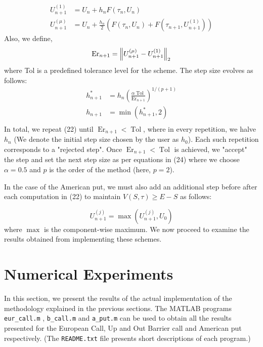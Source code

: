 \documentclass[a4paper,12pt]{article}
\begin{document}
\begin{equation}
    \begin{split}
        U_{n+1}^{(1)} &= U_n + h_n F(\tau_n, U_n)\\
        U_{n+1}^{(\mu)} &= U_n + \frac{h_n}{2}\left( F(\tau_n, U_n) + F(\tau_{n+1}, U_{n+1}^{(1)}) \right)
    \end{split}
\end{equation}
Also, we define,
\begin{equation}
    \operatorname{Er}_{n+1} = {\left \lVert U_{n+1}^{(\mu)} - U_{n+1}^{(1)} \right \rVert}_2
\end{equation}
where Tol is a predefined tolerance level for the scheme. The step size evolves as follows:
\begin{equation}
    \begin{split}
        h_{n+1}^* &= h_n\left( \frac{\alpha \operatorname{Tol}}{\operatorname{Er}_{n+1}} \right)^{1/(p+1)}\\
        h_{n+1} &= \min(h_{n+1}^*, 2)\\
    \end{split}
\end{equation}
In total, we repeat (22) until $\operatorname{Er}_{n+1} < \operatorname{Tol}$, where in every repetition, we halve $h_n$ (We denote the initial step size chosen by the user as $h_0$). Each such repetition corresponds to a "rejected step". Once $\operatorname{Er}_{n+1} < \operatorname{Tol}$ is achieved, we "accept" the step and set the next step size as per equations in (24) where we choose $\alpha = 0.5$ and $p$ is the order of the method (here, $p = 2$).

In the case of the American put, we must also add an additional step before after each computation in (22) to maintain $V(S, \tau) \geq E - S$ as follows:

\begin{equation}
    U_{n+1}^{(j)} = \max(U_{n+1}^{(j)}, U_0)
\end{equation}
where $\max$ is the component-wise maximum. We now proceed to examine the results obtained from implementing these schemes.

\section{Numerical Experiments}

In this section, we present the results of the actual implementation of the methodology explained in the previous sections. The MATLAB programs \texttt{eur\_call.m} , \texttt{b\_call.m} and \texttt{a\_put.m} can be used to obtain all the results presented for the European Call, Up and Out Barrier call and American put respectively. (The \texttt{README.txt} file presents short descriptions of each program.)
\end{document}
